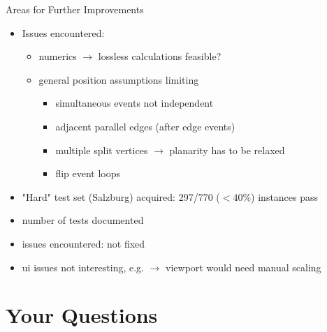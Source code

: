 \documentclass[
  size=9pt,
  style=klope,
  paper=screen,
  mode=print,
  display=slides,
  nohandoutpagebreaks,
  pauseslide,
  hlsections,
  fleqn,
  dvips,
  clock
]{powerdot}
\begin{document}
\begin{slide}{Areas for Further Improvements}
  \begin{itemize}
    \item Issues encountered:
    \begin{itemize}
      \item numerics $\rightarrow$ lossless calculations feasible?
      \item general position assumptions limiting
      \begin{itemize}
        \item simultaneous events not independent
        \item adjacent parallel edges (after edge events)
        \item multiple split vertices $\rightarrow$ planarity has to be relaxed
        \item flip event loops
      \end{itemize}
    \end{itemize}

    \item "Hard" test set (Salzburg) acquired: 297/770 ($<40\%$) instances pass
  \end{itemize}
\end{slide}
\begin{note}{}
  \begin{itemize}
    \item number of tests documented
    \item issues encountered: not fixed
    \item ui issues not interesting, e.g. $\rightarrow$ viewport would need manual scaling
  \end{itemize}
\end{note}

\section[template=wideslide]{Your Questions}
\end{document}
